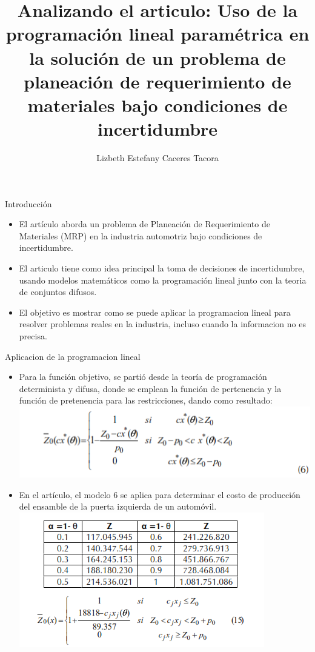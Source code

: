 \documentclass{beamer}
\title{Analizando el articulo: Uso de la programación lineal paramétrica en la solución de un problema de planeación de requerimiento de materiales bajo condiciones de incertidumbre }
\author{Lizbeth Estefany Caceres Tacora}
\date{}
\begin{document}
\frame{\titlepage}

\begin{frame}{Introducción}
\begin{itemize}
    \item El artículo aborda un problema de Planeación de Requerimiento de Materiales (MRP) en la industria automotriz bajo condiciones de incertidumbre.
    \item El articulo tiene como idea principal la toma de decisiones de incertidumbre, usando modelos matemáticos como la programación lineal junto con la teoria de conjuntos difusos.
    \item El objetivo es mostrar como se puede aplicar la programacion lineal para resolver problemas reales en la industria, incluso cuando la informacion no es precisa.
\end{itemize}
\end{frame}

\begin{frame}{Aplicacion de la programacion lineal}
\begin{itemize}
    \item Para la función objetivo, se partió desde la teoría de programación determinista y difusa, donde se emplean la función de pertenencia y la función de pretenencia para las restricciones, dando como resultado:
    \centering
    \includegraphics[width=0.6 \linewidth]{pl_1.png}
    \item En el artículo, el modelo 6 se aplica para determinar el costo de producción del ensamble de la puerta izquierda de un automóvil.
    \centering
    \includegraphics[width=0.65\linewidth]{pl_2.png}
    
    \end{itemize}
\end{frame}
\end{document}
